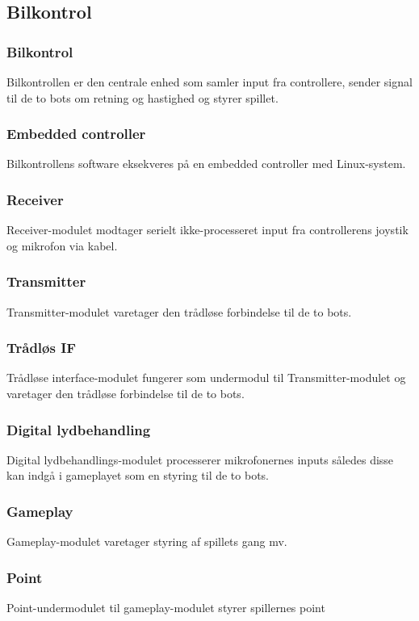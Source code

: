 \subsection{Bilkontrol}


\subsubsection*{\textbf{Bilkontrol}}
Bilkontrollen er den centrale enhed som samler input fra controllere, sender signal til de to bots om retning og hastighed og styrer spillet. 
\subsubsection*{\textbf{Embedded controller}}
Bilkontrollens software eksekveres på en embedded controller med Linux-system. 
\subsubsection*{\textbf{Receiver}}
Receiver-modulet modtager serielt ikke-processeret input fra controllerens joystik og mikrofon via kabel. 
\subsubsection*{\textbf{Transmitter}}
Transmitter-modulet varetager den trådløse forbindelse til de to bots.
\subsubsection*{\textbf{Trådløs IF}}
Trådløse interface-modulet fungerer som undermodul til Transmitter-modulet og varetager den trådløse forbindelse til de to bots. 
\subsubsection*{\textbf{Digital lydbehandling}}
Digital lydbehandlings-modulet processerer mikrofonernes inputs således disse kan indgå i gameplayet som en styring til de to bots.  
\subsubsection*{\textbf{Gameplay}}
Gameplay-modulet varetager styring af spillets gang mv.  
\subsubsection*{\textbf{Point}}
Point-undermodulet til gameplay-modulet styrer spillernes point 
